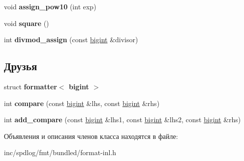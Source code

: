 \begin{DoxyCompactItemize}
\item 
\mbox{\label{classinternal_1_1bigint_a9e149796f225f2925da3db8f0576dd91}} 
void {\bfseries assign\+\_\+pow10} (int exp)
\item 
\mbox{\label{classinternal_1_1bigint_a940814011f7f4dec8d94a25d258a35b9}} 
void {\bfseries square} ()
\item 
\mbox{\label{classinternal_1_1bigint_a38ed353f68e3e66aaf32574c342ba36c}} 
int {\bfseries divmod\+\_\+assign} (const \hyperlink{classinternal_1_1bigint}{bigint} \&divisor)
\end{DoxyCompactItemize}
\subsection*{Друзья}
\begin{DoxyCompactItemize}
\item 
\mbox{\label{classinternal_1_1bigint_a2cd69505524105acb7ee0daf64b55996}} 
struct {\bfseries formatter$<$ bigint $>$}
\item 
\mbox{\label{classinternal_1_1bigint_a884a200c3d37a8c8179ae5d04a07cc75}} 
int {\bfseries compare} (const \hyperlink{classinternal_1_1bigint}{bigint} \&lhs, const \hyperlink{classinternal_1_1bigint}{bigint} \&rhs)
\item 
\mbox{\label{classinternal_1_1bigint_aa5f9a8e926ca7b38a1d1527f75d79830}} 
int {\bfseries add\+\_\+compare} (const \hyperlink{classinternal_1_1bigint}{bigint} \&lhs1, const \hyperlink{classinternal_1_1bigint}{bigint} \&lhs2, const \hyperlink{classinternal_1_1bigint}{bigint} \&rhs)
\end{DoxyCompactItemize}


Объявления и описания членов класса находятся в файле\+:\begin{DoxyCompactItemize}
\item 
inc/spdlog/fmt/bundled/format-\/inl.\+h\end{DoxyCompactItemize}

